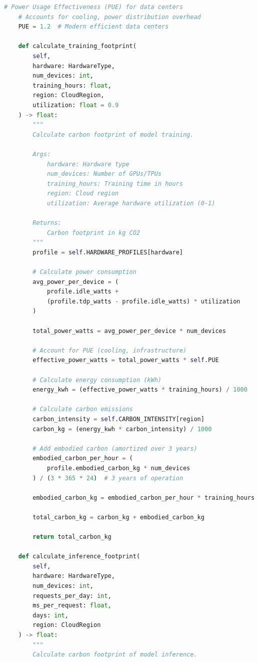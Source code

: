 \begin{lstlisting}[language=Python, caption=ML Carbon Footprint Calculator]
    # Power Usage Effectiveness (PUE) for data centers
    # Accounts for cooling, power distribution overhead
    PUE = 1.2  # Modern efficient data centers

    def calculate_training_footprint(
        self,
        hardware: HardwareType,
        num_devices: int,
        training_hours: float,
        region: CloudRegion,
        utilization: float = 0.9
    ) -> float:
        """
        Calculate carbon footprint of model training.

        Args:
            hardware: Hardware type
            num_devices: Number of GPUs/TPUs
            training_hours: Training time in hours
            region: Cloud region
            utilization: Average hardware utilization (0-1)

        Returns:
            Carbon footprint in kg CO2
        """
        profile = self.HARDWARE_PROFILES[hardware]

        # Calculate power consumption
        avg_power_per_device = (
            profile.idle_watts +
            (profile.tdp_watts - profile.idle_watts) * utilization
        )

        total_power_watts = avg_power_per_device * num_devices

        # Account for PUE (cooling, infrastructure)
        effective_power_watts = total_power_watts * self.PUE

        # Calculate energy consumption (kWh)
        energy_kwh = (effective_power_watts * training_hours) / 1000

        # Calculate carbon emissions
        carbon_intensity = self.CARBON_INTENSITY[region]
        carbon_kg = (energy_kwh * carbon_intensity) / 1000

        # Add embodied carbon (amortized over 3 years)
        embodied_carbon_per_hour = (
            profile.embodied_carbon_kg * num_devices
        ) / (3 * 365 * 24)  # 3 years of operation

        embodied_carbon_kg = embodied_carbon_per_hour * training_hours

        total_carbon_kg = carbon_kg + embodied_carbon_kg

        return total_carbon_kg

    def calculate_inference_footprint(
        self,
        hardware: HardwareType,
        num_devices: int,
        requests_per_day: int,
        ms_per_request: float,
        days: int,
        region: CloudRegion
    ) -> float:
        """
        Calculate carbon footprint of model inference.


\end{lstlisting}
